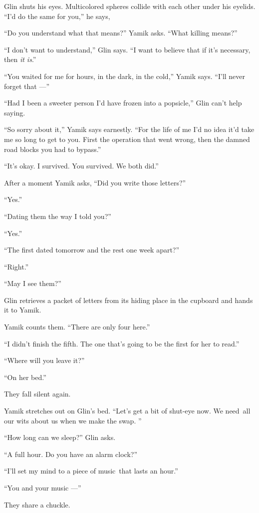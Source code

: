\documentclass[twoside,11pt]{book}
\begin{document}
Glin shuts his eyes. Multicolored spheres collide with each other under his eyelids. ``I'd do the same for
you,'' he says,

``Do you understand what that means?'' Yamik asks. ``What killing
means?''

``I don't want to understand,'' Glin says. ``I want to believe that if it's
necessary, then \textit{it is}.''

``You waited for me for hours, in the dark, in the cold,'' Yamik says. ``I'll
never forget that ---''

``Had I been a sweeter person I'd have frozen into a popsicle,'' Glin can't help saying.

``So sorry about it,'' Yamik says earnestly. ``For the life of me I'd no idea
it'd take me so long to get to you. First the operation that went wrong, then the damned road blocks you had to
bypass.''

``It's okay. I survived. You survived. We both did.''

After a moment Yamik asks, ``Did you write those letters?''

``Yes.''

``Dating them the way I told you?''

``Yes.''

``The first dated tomorrow and the rest one week apart?''

``Right.''

``May I see them?''

Glin retrieves a packet of letters from its hiding place in the cupboard and hands it to Yamik.

Yamik counts them. ``There are only four here.''

``I didn't finish the fifth. The one that's going to be the first for her to read.''

``Where will you leave it?''

``On her bed.''

They fall silent again.

Yamik stretches out on Glin's bed. ``Let's get a bit of shut-eye now. We need~all our wits about us when we
make the swap. ''

``How long can we sleep?'' Glin asks.

``A full hour. Do you have an alarm clock?''

``I'll set my mind to a piece of music~that lasts an hour.''

``You and your music ---''

They share a chuckle.
\end{document}
